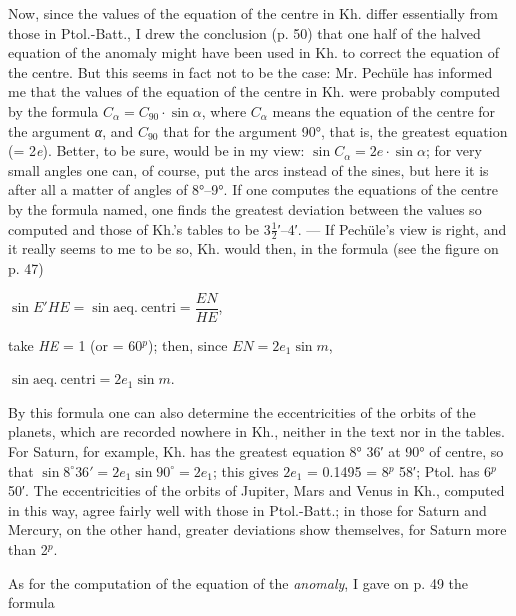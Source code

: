 \documentclass[11pt]{article}
\newcommand{\Pg}[1]{\marginpar{\footnotesize\color{gray}#1}}
\begin{document}
\par \Pg{234}Now, since the values of the equation of the centre in Kh. differ essentially from those in Ptol.-Batt., I drew the conclusion (p. 50) that one half of the halved equation of the anomaly might have been used in Kh. to correct the equation of the centre. But this seems in fact not to be the case: Mr. Pechüle has informed me that the values of the equation of the centre in Kh. were probably computed by the formula $C_{\alpha} = C_{90}\cdot\sin\alpha$, where $C_{\alpha}$ means the equation of the centre for the argument \emph{{\greekfont α}}, and $C_{90}$ that for the argument 90°, that is, the greatest equation (= 2\emph{e}). Better, to be sure, would be in my view: $\sin C_{\alpha} = 2e\cdot\sin\alpha$; for very small angles one can, of course, put the arcs instead of the sines, but here it is after all a matter of angles of 8°–9°. If one computes the equations of the centre by the formula named, one finds the greatest deviation between the values so computed and those of Kh.'s tables to be 3$\tfrac{1}{2}$′–4′. — If Pechüle's view is right, and it really seems to me to be so, Kh. would then, in the formula (see the figure on p. 47)\par
\par\begin{center}$\sin E'HE = \sin\mathrm{aeq.\ centri} = \dfrac{EN}{HE}$,\end{center}
\par take \emph{HE} = 1 (or = 60$^{p}$); then, since $EN = 2e_{1}\sin m$,\par
\par\begin{center}$\sin\mathrm{aeq.\ centri} = 2e_{1}\sin m$.\end{center}
\par By this formula one can also determine the eccentricities of the orbits of the planets, which are recorded nowhere in Kh., neither in the text nor in the tables. For Saturn, for example, Kh. has the greatest equation 8° 36′ at 90° of centre, so that $\sin 8^{\circ}36' = 2e_{1}\sin 90^{\circ} = 2e_{1}$; this gives $2e_{1}$ = 0.1495 = 8$^{p}$ 58′; Ptol. has 6$^{p}$ 50′. The eccentricities of the orbits of Jupiter, Mars and Venus in Kh., computed in this way, agree fairly well with those in Ptol.-Batt.; in those for Saturn and Mercury, on the other hand, greater deviations show themselves, for Saturn more than 2$^{p}$.\par
\par As for the computation of the equation of the \emph{anomaly}, I gave on p. 49 the formula\par
\end{document}

